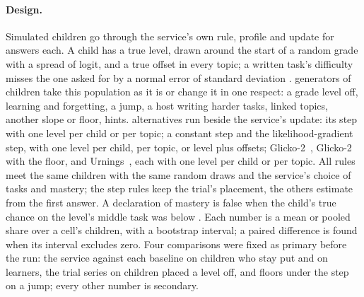 \paragraph{Design.} Simulated children go through the service's own rule, profile and update for  answers each. A child has a true level, drawn around the start of a random grade with a spread of  logit, and a true offset in every topic; a written task's difficulty misses the one asked for by a normal error of standard deviation .  generators of  children take this population as it is or change it in one respect: a grade level off, learning and forgetting, a jump, a host writing harder tasks, linked topics, another slope or floor, hints.  alternatives run beside the service's update: its step with one level per child or per topic; a constant step and the likelihood-gradient step, with one level per child, per topic, or level plus offsets; Glicko-2~\cite{glickman2022glicko2}, Glicko-2 with the floor, and Urnings~\cite{bolsinova2022urnings}, each with one level per child or per topic. All rules meet the same children with the same random draws and the service's choice of tasks and mastery; the step rules keep the trial's placement, the others estimate from the first answer. A declaration of mastery is false when the child's true chance on the level's middle task was below . Each number is a mean or pooled share over a cell's children, with a \pct{} bootstrap interval; a paired difference is found when its interval excludes zero. Four comparisons were fixed as primary before the run: the service against each baseline on children who stay put and on learners, the trial series on children placed a level off, and floors under the step on a jump; every other number is secondary.

